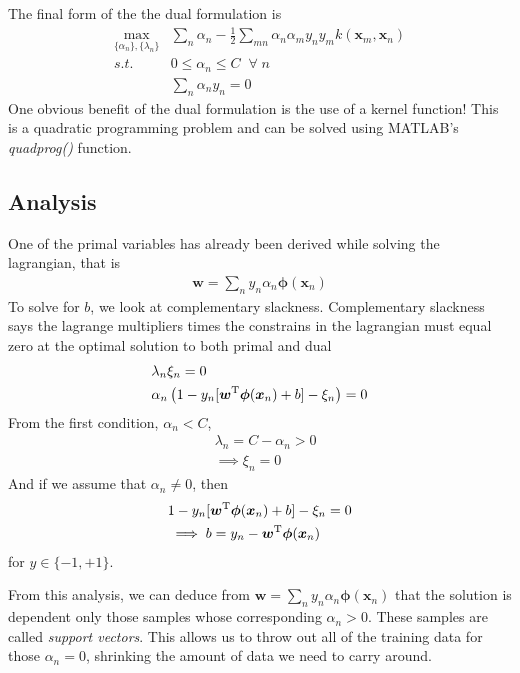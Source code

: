 \documentclass[11pt]{article}
\newcommand{\vct}[1]{\boldsymbol{#1}} %
\newcommand{\T}{^{\textrm T}} %
\begin{document}
The final form of the the dual formulation is
\begin{align*}
 \max_{ \{\alpha_{n}\}, \{\lambda_{n}\}} & \sum_{n} \alpha_{n}  - \frac{1}{2}\sum_{mn} \alpha_{n} \alpha_{m}y_{n}y_{m}  k(\vct{x}_{m},\vct{x}_{n})\\
 s.t. \;\;\;& 0 \le \alpha_{n} \le C \;\; \forall\; n\\
 & \sum_{n}  \alpha_{n} y_{n} = 0
\end{align*}
One obvious benefit of the dual formulation is the use of a kernel function! This is a quadratic programming problem and can be solved using MATLAB's {\it quadprog()} function.

\subsection{Analysis}
One of the primal variables has already been derived while solving the lagrangian, that is
\begin{align*}
\vct{w} = \sum_{n} y_{n} \alpha_{n} \vct{\phi}(\vct{x}_{n})
\end{align*}
To solve for $b$, we look at complementary slackness. Complementary slackness says the lagrange multipliers times the constrains in the lagrangian must equal zero at the optimal solution to both primal and dual
\begin{align*}
&\lambda_{n} \xi_{n} = 0\\
 &\alpha_{n} \left(1 - y_{n}[\vct{w}\T \vct{\phi}(\vct{x}_{n}) + b] - \xi_{n} \right) = 0\\
\end{align*}
From the first condition, $\alpha_n < C$, 
\begin{align*}
&\lambda_n = C - \alpha_n > 0\\
&\implies \xi_n = 0
\end{align*}
And if we assume that $\alpha_n \ne 0$, then
\begin{align*}
&1 - y_{n}[\vct{w}\T \vct{\phi}(\vct{x}_{n}) + b] - \xi_{n} = 0\\
&\implies b = y_n - \vct{w}\T \vct{\phi}(\vct{x}_{n})
\end{align*}
for $y \in \{-1, +1\}$.

From this analysis, we can deduce from $ \vct{w} = \sum_{n} y_{n} \alpha_{n} \vct{\phi}(\vct{x}_{n})$ that the solution is dependent only those samples whose corresponding $\alpha_n > 0$. These samples are called {\it support vectors}. This allows us to throw out all of the training data for those $\alpha_n = 0$, shrinking the amount of data we need to carry around. 
\end{document}
